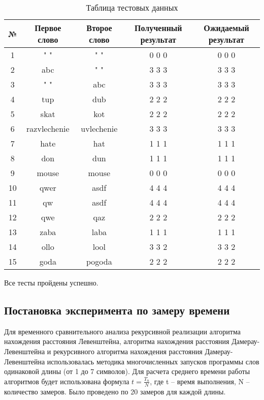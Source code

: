 \documentclass[a4paper, 14pt]{article}
\begin{document}
\begin{table}[H]
\begin{center}
\caption{Таблица тестовых данных}
	\begin{tabular}{|c|c|c|c|c|}
	\hline 
	№ & Первое слово & Второе слово & Полученный результат & Ожидаемый результат \\ 
	\hline 
	1 & " " & " " & 0 0 0 & 0 0 0 \\ 
	\hline 
	2 & abc & " " & 3 3 3 & 3 3 3 \\ 
	\hline 
	3 & " " & abc & 3 3 3 & 3 3 3 \\ 
	\hline 
	4 & tup & dub & 2 2 2 & 2 2 2 \\ 
	\hline 
	5 & skat & kot & 2 2 2 & 2 2 2 \\ 
	\hline 
	6 & razvlechenie & uvlechenie & 3 3 3 & 3 3 3 \\ 
	\hline 
	7 & hate & hat & 1 1 1 & 1 1 1 \\ 
	\hline 
	8 & don & dun & 1 1 1 & 1 1 1 \\ 
	\hline 
	9 & mouse & mouse & 0 0 0 & 0 0 0 \\ 
	\hline 
	10 & qwer & asdf & 4 4 4 & 4 4 4 \\ 
	\hline 
	11 & qw & asdf & 4 4 4 & 4 4 4 \\ 
	\hline 
	12 & qwe & qaz & 2 2 2 & 2 2 2 \\ 
	\hline 
	13 & zaba & laba & 1 1 1 & 1 1 1 \\ 
	\hline 
	14 & ollo & lool & 3 3 2 & 3 3 2 \\ 
	\hline 
	15 & goda & pogoda & 2 2 2 & 2 2 2 \\ 
	\hline 
	\end{tabular} 
	\end{center}
	\end{table}
	
	Все тесты пройдены успешно.
	
	\subsection{Постановка эксперимента по замеру времени}
	
	Для временного сравнительного анализа рекурсивной реализации алгоритма нахождения расстояния Левенштейна, алгоритма нахождения расстояния Дамерау-Левенштейна и рекурсивного алгоритма нахождения расстояния Дамерау-Левенштейна использовалась методика многочисленных запусков программы  слов одинаковой длины (от 1 до 7 символов). Для расчета среднего времени работы алгоритмов будет использована формула $t=\frac{T_n}{N}$, где t – время выполнения, N – количество замеров. Было проведено по 20 замеров для каждой длины.\\
\end{document}
